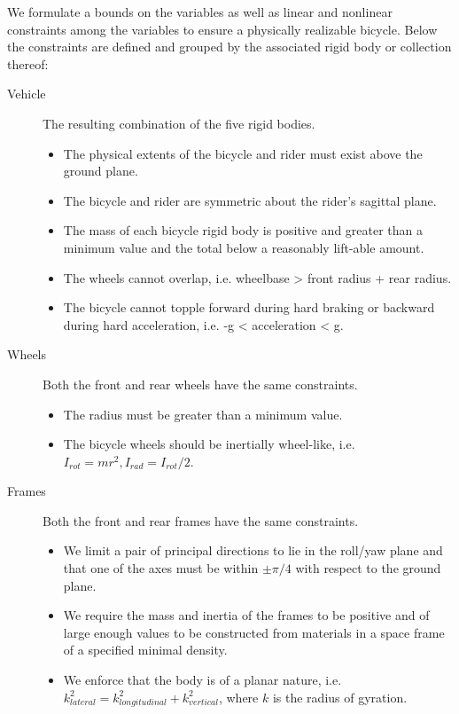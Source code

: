 \documentclass{bmd2019a}
\begin{document}
We formulate a bounds on the variables as well as linear and nonlinear
constraints among the variables to ensure a physically realizable bicycle.
Below the constraints are defined and grouped by the associated rigid body or
collection thereof:
%
\begin{description}

  \item[Vehicle] The resulting combination of the five rigid bodies.
    \begin{itemize}
      \itemsep0em
      \item The physical extents of the bicycle and rider must exist above the
        ground plane.
      \item The bicycle and rider are symmetric about the rider's sagittal
        plane.
      \item The mass of each bicycle rigid body is positive and greater than a
        minimum value and the total below a reasonably lift-able amount.
      \item The wheels cannot overlap, i.e. wheelbase > front radius + rear
        radius.
      \item The bicycle cannot topple forward during hard braking or backward
        during hard acceleration, i.e. -g < acceleration < g.
    \end{itemize}

  \item[Wheels] Both the front and rear wheels have the same constraints.
    \begin{itemize}
      \itemsep0em
      \item The radius must be greater than a minimum value.
      \item The bicycle wheels should be inertially wheel-like, i.e.
        $I_{rot}=mr^2, I_{rad}=I_{rot}/2$.
    \end{itemize}

  \item[Frames] Both the front and rear frames have the same constraints.
    \begin{itemize}
      \itemsep0em
      \item We limit a pair of principal directions to lie in the roll/yaw
        plane and that one of the axes must be within $\pm \pi/4$ with respect
        to the ground plane.
      \item We require the mass and inertia of the frames to be positive and of
        large enough values to be constructed from materials in a space frame
        of a specified minimal density.
      \item We enforce that the body is of a planar nature, i.e.
        $k_{lateral}^2=k_{longitudinal}^2+k_{vertical}^2$, where $k$ is the
        radius of gyration.
    \end{itemize}


\end{description}
\end{document}
